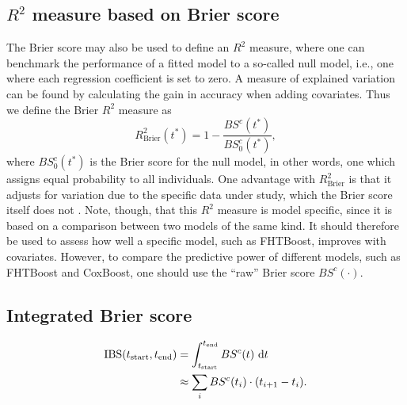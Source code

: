 \subsection{$R^2$ measure based on Brier score}
The Brier score may also be used to define an $R^2$ measure, where one can benchmark the performance of a fitted model to a so-called null model, i.e., one where each regression coefficient is set to zero. A measure of explained variation can be found by calculating the gain in accuracy when adding covariates. Thus we define the Brier $R^2$ measure as
\begin{equation*}
    R^2_{\text{Brier}}(t^*)=1-\frac{BS^c(t^*)}{BS^c_0(t^*)},
\end{equation*}
where $BS^c_0(t^*)$ is the Brier score for the null model, in other words, one which assigns equal probability to all individuals.
One advantage with $R^2_{\text{Brier}}$ is that it adjusts for variation due to the specific data under study, which the Brier score itself does not \citep{bovelstadborgan}.
Note, though, that this $R^2$ measure is model specific, since it is based on a comparison between two models of the same kind.
It should therefore be used to assess how well a specific model, such as FHTBoost, improves with covariates.
However, to compare the predictive power of different models, such as FHTBoost and CoxBoost, one should use the ``raw'' Brier score $BS^c(\cdot)$.

\subsection{Integrated Brier score}
\begin{align*}
    \text{IBS}(t_{\text{start}}, t_{\text{end}})&=\int_{t_{\text{start}}}^{t_{\text{end}}}BS^c(t)~\text{d} t \\
    &\approx\sum_{i}BS^c(t_i)\cdot(t_{i+1}-t_{i}).
\end{align*}


